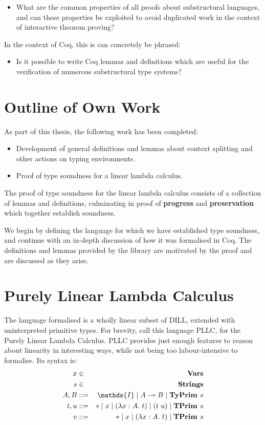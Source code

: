 \documentclass[]{unswthesis}
\newcommand{\lam}[1]{\lambda #1 \ldotp \,}
\newcommand{\app}[2]{(#1 \; #2)}
\newcommand{\lolly}{\multimap}
\newcommand{\sor}{\; | \;}
\newcommand{\TyPrim}[1]{\b{TyPrim } #1}
\newcommand{\TPrim}[1]{\b{TPrim } #1}
\let\b\textbf
\begin{document}
\begin{itemize}
\item What are the common properties of all proofs about substructural languages, and can these properties be exploited to avoid duplicated work in the context of interactive theorem proving?
\end{itemize}

In the context of Coq, this is can concretely be phrased:

\begin{itemize}
\item Is it possible to write Coq lemmas and definitions which are useful for the verification of numerous substructural type systems?
\end{itemize}


\section{Outline of Own Work}

As part of this thesis, the following work has been completed:

\begin{itemize}
\item Development of general definitions and lemmas about context splitting and other actions on typing environments.
\item Proof of type soundness for a linear lambda calculus.
\end{itemize}

The proof of type soundness for the linear lambda calculus consists of a collection of lemmas and definitions, culminating in proof of \b{progress} and \b{preservation} which together establish soundness.

We begin by defining the language for which we have established type soundness, and continue with an in-depth discussion of how it was formalised in Coq. The definitions and lemmas provided by the library are motivated by the proof and are discussed as they arise.

\section{Purely Linear Lambda Calculus}

The language formalised is a wholly linear subset of DILL, extended with uninterpreted primitive types. For brevity, call this language PLLC, for the Purely Linear Lambda Calculus. PLLC provides just enough features to reason about linearity in interesting ways, while not being too labour-intensive to formalise. Its syntax is:
\begin{eqnarray*}
x & \in & \b{Vars} \\
s & \in & \b{Strings} \\
A,B & ::= & \mathds{I} \sor A \lolly B \sor \TyPrim{s} \\
t,u & ::= & * \sor x \sor (\lam{x : A} t) \sor \app{t}{u} \sor \TPrim{s} \\
v & ::= & * \sor x \sor (\lam{x : A} t) \sor \TPrim{s}
\end{eqnarray*}
\end{document}
